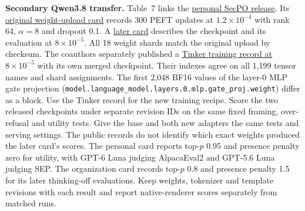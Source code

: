 \documentclass[11pt]{article}
\begin{document}
\textbf{Secondary Qwen3.8 transfer.} Table~7 links the \href{https://huggingface.co/Sizhe-Chen/Qwen3.8-27B-Instruct-SecPO/tree/bf0000441fc01a3075cd4fde210a0980bd90428f}{personal SecPO release}. Its \href{https://huggingface.co/Sizhe-Chen/Qwen3.8-27B-Instruct-SecPO/blob/ae8668e5d28a380027e75056d3251c37b8b88102/README.md}{original weight-upload card} records 300 PEFT updates at $1.2\times10^{-4}$ with rank 64, $\alpha=8$ and dropout 0.1. A \href{https://huggingface.co/Sizhe-Chen/Qwen3.8-27B-Instruct-SecPO/blob/728de8ebba184b23c9a96e6cc31c67dca6e139c5/README.md}{later card} describes the checkpoint and its evaluation at $8\times10^{-5}$. All 18 weight shards match the original upload by checksum. The coauthors separately published a \href{https://huggingface.co/promptinjections/Qwen3.8-27B-SecPO-lr8e-5/blob/24d2b8a7b2166c607d4f1e0f1e13bbf8a9d555d7/training_summary.json}{Tinker training record at $8\times10^{-5}$} with its own merged checkpoint. Their indexes agree on all 1,199 tensor names and shard assignments. The first 2,048 BF16 values of the layer-0 MLP gate projection (\nolinkurl{model.language_model.layers.0.mlp.gate_proj.weight}) differ as a block. Use the Tinker record for the new training recipe. Score the two released checkpoints under separate revision IDs on the same fixed framing, over-refusal and utility tests. Give the base and both new adapters the same tests and serving settings. The public records do not identify which exact weights produced the later card’s scores. The personal card reports top-$p$ 0.95 and presence penalty zero for utility, with GPT-6 Luna judging AlpacaEval2 and GPT-5.6 Luna judging SEP. The organization card records top-$p$ 0.8 and presence penalty 1.5 for its later thinking-off evaluations. Keep weights, tokenizer and template revisions with each result and report native-renderer scores separately from matched runs.
\end{document}
